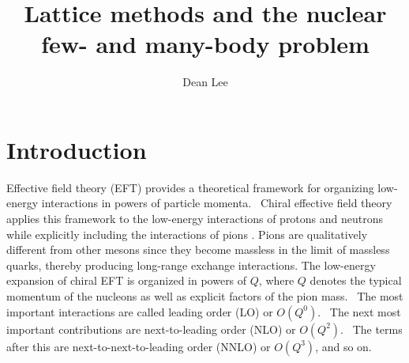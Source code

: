 \title{Lattice methods and the nuclear few- and many-body problem}
\author{Dean Lee}
\maketitle




\section{Introduction}

Effective field theory (EFT) provides a theoretical framework for organizing low-energy
interactions in powers of particle
momenta. \ Chiral
effective field theory   applies this framework to the low-energy interactions of protons and neutrons while explicitly including the interactions of pions \cite{Weinberg:1990rz,Weinberg:1991um,Ordonez:1992xp,Ordonez:1993tn,vanKolck:1994yi,Epelbaum:1998hg,Epelbaum:1998ka,Bedaque:2002mn,Epelbaum:2008ga}.
Pions are qualitatively different from other mesons since they become massless in the limit of massless quarks, thereby producing long-range exchange interactions. The low-energy expansion of chiral EFT is organized
in powers of $Q$, where $Q$ denotes the typical momentum of the nucleons as well as explicit factors of the pion mass. \ The most important interactions are called
leading order (LO) or $O(Q^{0})$. \ The next most important contributions
are 
next-to-leading order (NLO) or $O(Q^{2})$. \ The terms after this are
next-to-next-to-leading order (NNLO) or $O(Q^{3})$, and so on. 

